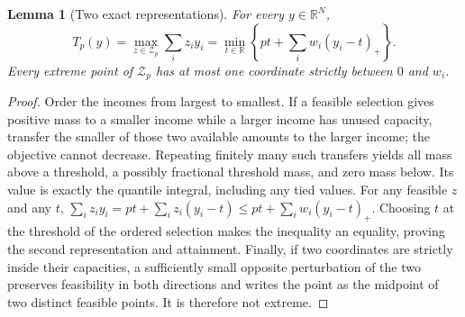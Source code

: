 \documentclass[11pt]{article}
\newtheorem{lemma}[theorem]{Lemma}
\theoremstyle{remark}\newtheorem{remark}[theorem]{Remark}
\newcommand{\R}{\mathbb R}
\begin{document}
\begin{lemma}[Two exact representations]\label{rep}
For every $y\in\R^N$,
\[
 T_p(y)=\max_{z\in\mathcal Z_p}\sum_i z_i y_i
       =\min_{t\in\R}\left\{pt+\sum_iw_i(y_i-t)_+\right\}.
\]
Every extreme point of $\mathcal Z_p$ has at most one coordinate strictly between $0$ and $w_i$.
\end{lemma}
\begin{proof}
Order the incomes from largest to smallest. If a feasible selection gives positive mass to a smaller income while a larger income has unused capacity, transfer the smaller of those two available amounts to the larger income; the objective cannot decrease. Repeating finitely many such transfers yields all mass above a threshold, a possibly fractional threshold mass, and zero mass below. Its value is exactly the quantile integral, including any tied values.
For any feasible $z$ and any $t$,
$\sum_i z_i y_i=pt+\sum_i z_i(y_i-t)
\leq pt+\sum_iw_i(y_i-t)_+$.
Choosing $t$ at the threshold of the ordered selection makes the inequality an equality, proving the second representation and attainment. Finally, if two coordinates are strictly inside their capacities, a sufficiently small opposite perturbation of the two preserves feasibility in both directions and writes the point as the midpoint of two distinct feasible points. It is therefore not extreme.
\end{proof}
\end{document}
